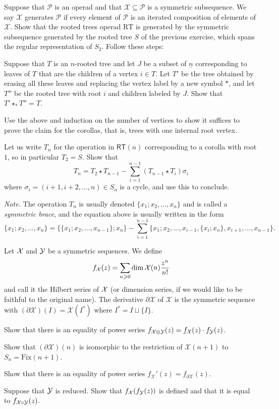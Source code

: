 \begin{question}
Suppose that $\mathcal P$ is an operad
and that $\mathcal X\subseteq \mathcal P$
is a symmetric subsequence. We say
$\mathcal X$ generates $\mathcal P$
if every element of $\mathcal P$ is
an iterated composition of elements of
$\mathcal X$. 
Show that the rooted trees operad 
$\mathrm{RT}$ 
is generated by the symmetric subsequence
generated by the rooted tree $S$ of the
previous exercise, which spans
the regular representation of
$S_2$. Follow these steps:
\end{question}
\begin{tenumerate}
\item Suppose that $T$ is an $n$-rooted tree
and let $J$ be a subset of $\underline{n}$ corresponding
to leaves of $T$ that are the children of a
vertex $i\in T$. Let $T'$ be the
tree obtained by erasing all these leaves
and replacing the vertex label by a new
symbol $\ast$, and let $T''$ be the rooted
tree with root $i$ and children labeled
by $J$. Show that $T'\star_\ast T'' = T$.
\item Use the above and induction on the
number of vertices to show it suffices to prove
the claim for the corollas, that is, trees with
one internal root vertex.
\item Let us write $T_n$
for the operation in $\mathsf{RT}(n)$
corresponding to a corolla with root $1$,
so in particular $T_2 = S$.
Show that 
\[ 
T_n = 
 T_2\star T_{n-1} - 
  	\sum_{i=1}^{n-1} (T_{n-1}\star T_i)\sigma_i
\]
where $\sigma_i = (i+1,i+2,\ldots,n)\in S_n$
is a cycle, and use this to conclude.
\end{tenumerate}

\emph{Note.} The operation $T_n$ is usually
denoted $\{x_1; x_2,\ldots,x_n\}$ and is called
a \emph{symmetric brace}, and the equation
above is usually written in the form
\[ 
\{x_1; x_2,\ldots,x_n\} = 
 \{\{x_1; x_2,\ldots,x_{n-1}\}; x_n\}
 - \sum_{i=1}^{n-1} \{ x_1; x_2,
 \ldots, x_{i-1}, \{x_i ; x_n \},
 x_{i+1},\ldots,x_{n-1}\}.
 \]
 
 \begin{question}\label{ex:operations-on-species}
 Let $\mathcal{X}$ and $\mathcal{Y}$ be a symmetric sequences.
 We define \[f_{\mathcal{X}}(z) = \sum_{n\geqslant 0} \dim \mathcal{X}(n) \frac{z^n}{n!}\]
 and call it the Hilbert series of $\mathcal{X}$
 (or dimension series, if we would like to be
 faithful to the original name). The derivative $\partial\mathcal X$ 
 of $\mathcal X$ is the symmetric sequence
 with $(\partial\mathcal X)(I) = \mathcal X(I^*)$
 where $I^* = I \sqcup \{ I \}$.
 \begin{tenumerate}
 \item Show that there is an equality of power series $f_{\mathcal{X}\otimes \mathcal{Y}}(z) = f_{\mathcal{X}}(z)\cdot f_{\mathcal{Y}}(z)$.
 \item Show that $(\partial \mathcal X)(n)$ 
 is isomorphic to the restriction of $\mathcal{X}(n+1)$ to $S_n = \mathrm{Fix}(n+1)$.
 \item  Show  that there is an equality of power series $f_{\mathcal X}'(z) = 
  			f_{\partial\mathcal X}(z)$.
  \item Suppose that $\mathcal{Y}$ is reduced. Show that $f_{\mathcal{X}}(f_{\mathcal{Y}}(z))$ is defined and that it is equal to 
  $f_{\mathcal{X}\circ \mathcal{Y}}(z)$.
  \end{tenumerate}
 \end{question}

